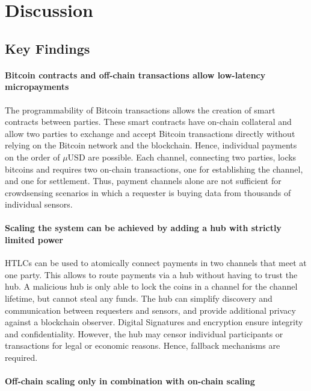 \section{Discussion}
\label{sec:trustlessdiscussion}

\subsection{Key Findings}

\paragraph{Bitcoin contracts and off-chain transactions allow low-latency micropayments}

The programmability of Bitcoin transactions allows the creation of smart contracts between parties. These smart contracts have on-chain collateral and allow two parties to exchange and accept Bitcoin transactions directly without relying on the Bitcoin network and the blockchain. Hence, individual payments on the order of $\mu$USD are possible. Each channel, connecting two parties, locks bitcoins and requires two on-chain transactions, one for establishing the channel, and one for settlement. Thus, payment channels alone are not sufficient for crowdsensing scenarios in which a requester is buying data from thousands of individual sensors. 

\paragraph{Scaling the system can be achieved by adding a hub with strictly limited power}

\ac{HTLC}s can be used to atomically connect payments in two channels that meet at one party. This allows to route payments via a hub without having to trust the hub. A malicious hub is only able to lock the coins in a channel for the channel lifetime, but cannot steal any funds. The hub can simplify discovery and communication between requesters and sensors, and provide additional privacy against a blockchain observer. Digital Signatures and encryption ensure integrity and confidentiality. However, the hub may censor individual participants or transactions for legal or economic reasons. Hence, fallback mechanisms are required.

\paragraph{Off-chain scaling only in combination with on-chain scaling}

